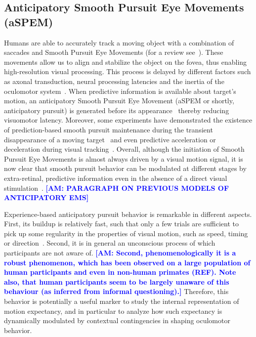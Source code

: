 \documentclass[10pt,letterpaper]{article}
\newcommand{\citep}[1]{\cite{#1}}
\newcommand{\citet}[1]{\cite{#1}}
\newcommand{\AM}[1]{\textbf{\textcolor{blue}{[AM: #1]}}}
\begin{document}
\subsection{Anticipatory Smooth Pursuit Eye Movements (aSPEM)}
Humans are able to accurately track a moving object
with a combination of saccades and
Smooth Pursuit Eye Movements (for a review see~\citet{Krauzlis2008}).
These movements allow us to align and
stabilize the object on the fovea,
thus enabling high-resolution visual processing.
This process is delayed by different factors such as axonal transduction,
neural processing latencies and the inertia of the oculomotor system~\citep{Krauzlis89}.
When predictive information is available about target's motion,
an anticipatory Smooth Pursuit Eye Movement (aSPEM or shortly, anticipatory pursuit)
is generated before its appearance~\citep{Westheimer1954, Kowler1979a, Kowler1979b}
thereby reducing visuomotor latency.
Moreover, some experiments have demonstrated the existence
of prediction-based smooth pursuit maintenance during
the transient disappearance of a moving target~\citep{Badler2006,BeckerFuchs1985,OrbandeXivryMissalLefevre_JOV2012}
and even predictive acceleration or deceleration during visual tracking~\citep{BeckerFuchs1985,CollinsBarnes2009}.
Overall, although the initiation of Smooth Pursuit Eye Movements
is almost always driven by a visual motion signal,
it is now clear that smooth pursuit behavior
can be modulated at different stages by extra-retinal, predictive information even in the absence of a direct visual stimulation~\citep{Barnes2008}.
\AM{PARAGRAPH ON PREVIOUS MODELS OF ANTICIPATORY EMS}

Experience-based anticipatory pursuit behavior is remarkable
in different aspects.
First, its buildup is relatively fast, such that only a few trials are sufficient
to pick up some regularity in the properties of visual motion, such as speed, timing or direction~\citep{Kowler1984,Maus2015,Deravet_JOV2018}.
Second, it is in general an unconscious process
of which participants are not aware of.
\AM{Second, phenomenologically it is a robust phenomenon, which has been observed on a large population of human participants and even in non-human primates (REF). Note also, that human participants seem to be largely unaware of this behaviour (as inferred from informal questioning).}
Therefore, this behavior is potentially a useful marker
to study the internal representation of motion expectancy, %
and in particular to analyze how such expectancy
is dynamically modulated by contextual contingencies in shaping oculomotor behavior.
\end{document}
